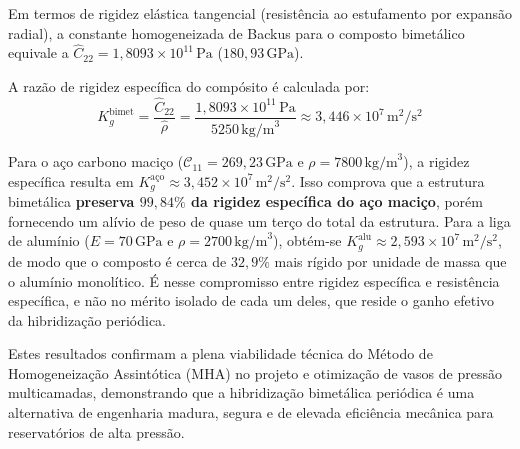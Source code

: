 Em termos de rigidez elástica tangencial (resistência ao estufamento por expansão radial), a constante homogeneizada de Backus para o composto bimetálico equivale a $\hat{C}_{22} = 1,8093 \times 10^{11} \, \text{Pa}$ ($180,93 \, \text{GPa}$).

A razão de rigidez específica do compósito é calculada por:
\begin{equation}
  K_g^{\text{bimet}} = \frac{\hat{C}_{22}}{\hat{\rho}} = \frac{1,8093 \times 10^{11} \, \text{Pa}}{5250 \, \text{kg/m}^3} \approx 3,446 \times 10^7 \, \text{m}^2/\text{s}^2
  \label{eq:rigidez_especifica_bimet}
\end{equation}

Para o aço carbono maciço ($\mathcal{C}_{11} = 269,23 \, \text{GPa}$ e $\rho = 7800 \, \text{kg/m}^3$), a rigidez específica resulta em $K_g^{\text{aço}} \approx 3,452 \times 10^7 \, \text{m}^2/\text{s}^2$. Isso comprova que a estrutura bimetálica \textbf{preserva $99,84\%$ da rigidez específica do aço maciço}, porém fornecendo um alívio de peso de quase um terço do total da estrutura. Para a liga de alumínio ($E = 70 \, \text{GPa}$ e $\rho = 2700 \, \text{kg/m}^3$), obtém-se $K_g^{\text{alu}} \approx 2,593 \times 10^7 \, \text{m}^2/\text{s}^2$, de modo que o composto é cerca de $32,9\%$ mais rígido por unidade de massa que o alumínio monolítico. É nesse compromisso entre rigidez específica e resistência específica, e não no mérito isolado de cada um deles, que reside o ganho efetivo da hibridização periódica.

Estes resultados confirmam a plena viabilidade técnica do Método de Homogeneização Assintótica (MHA) no projeto e otimização de vasos de pressão multicamadas, demonstrando que a hibridização bimetálica periódica é uma alternativa de engenharia madura, segura e de elevada eficiência mecânica para reservatórios de alta pressão.
